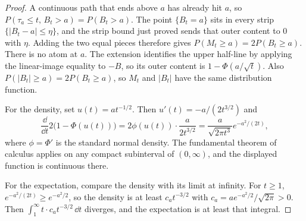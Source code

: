 \begin{proof}
A continuous path that ends above $a$ has already hit $a$, so $P(\tau_a\le t,\,B_t>a)=P(B_t>a)$. The point $\{B_t=a\}$ sits in every strip $\{|B_t-a|\le\eta\}$, and the strip bound just proved sends that outer content to $0$ with $\eta$. Adding the two equal pieces therefore gives $P(M_t\ge a)=2P(B_t\ge a)$. There is no atom at $a$. The extension identifies the upper half-line by applying the linear-image equality to $-B$, so its outer content is $1-\Phi(a/\sqrt t)$. Also $P(|B_t|\ge a)=2P(B_t\ge a)$, so $M_t$ and $|B_t|$ have the same distribution function.

For the density, set $u(t)=a t^{-1/2}$. Then $u'(t)=-a/(2t^{3/2})$ and
\[
 \frac{\dd}{\dd t}2\bigl(1-\Phi(u(t))\bigr)=2\phi(u(t))\cdot\frac{a}{2t^{3/2}}=\frac{a}{\sqrt{2\pi t^3}}e^{-a^2/(2t)},
\]
where $\phi=\Phi'$ is the standard normal density. The fundamental theorem of calculus applies on any compact subinterval of $(0,\infty)$, and the displayed function is continuous there.

For the expectation, compare the density with its limit at infinity. For $t\ge 1$, $e^{-a^2/(2t)}\ge e^{-a^2/2}$, so the density is at least $c_a t^{-3/2}$ with $c_a=a e^{-a^2/2}/\sqrt{2\pi}>0$. Then $\int_1^\infty t\cdot c_a t^{-3/2}\,\dd t$ diverges, and the expectation is at least that integral.
\end{proof}

